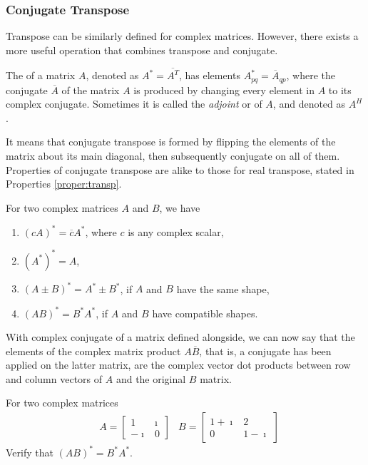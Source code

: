 \subsubsection{Conjugate Transpose}
Transpose can be similarly defined for complex matrices. However, there exists a more useful operation that combines transpose and conjugate.
\begin{defn}
\label{defn:conjutrans}
The  of a matrix $A$, denoted as $A^* = \overline{A^T}$, has elements $A^*_{pq} = \overline{A}_{qp}$, where the conjugate $\overline{A}$ of the matrix $A$ is produced by changing every element in $A$ to its complex conjugate. Sometimes it is called the \textit{adjoint} or  of $A$, and denoted as $A^H$. 
\end{defn}
It means that conjugate transpose is formed by flipping the elements of the matrix about its main diagonal, then subsequently conjugate on all of them. Properties of conjugate transpose are alike to those for real transpose, stated in Properties \ref{proper:transp}.
\begin{proper}
For two complex matrices $A$ and $B$, we have
\begin{enumerate}
\item $(cA)^* = \overline{c}A^*$, where $c$ is any complex scalar,
\item $(A^*)^* = A$,
\item $(A \pm B)^* = A^* \pm B^*$, if $A$ and $B$ have the same shape,
\item $(AB)^* = B^*A^*$, if $A$ and $B$ have compatible shapes.
\end{enumerate}
\end{proper}
With complex conjugate of a matrix defined alongside, we can now say that the elements of the complex matrix product $A\overline{B}$, that is, a conjugate has been applied on the latter matrix, are the complex vector dot products between row and column vectors of $A$ and the original $B$ matrix.
\begin{exmp}
For two complex matrices
\begin{align*}
& A =
\begin{bmatrix}
1 & \imath \\
-\imath & 0
\end{bmatrix} 
& B =
\begin{bmatrix}
1+\imath & 2 \\
0 & 1-\imath
\end{bmatrix}
\end{align*}
Verify that $(AB)^* = B^*A^*$.
\end{exmp}
